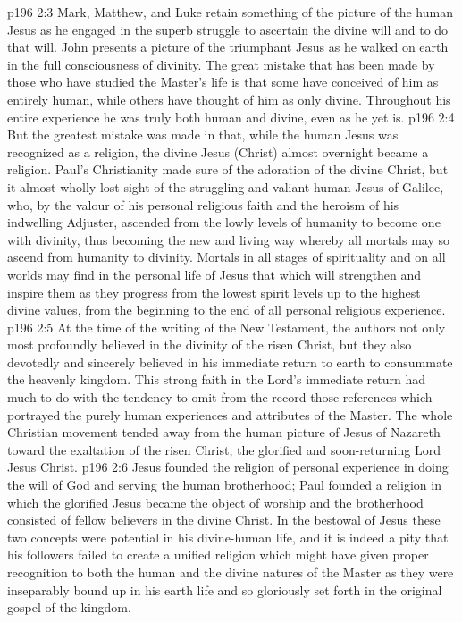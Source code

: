\vs p196 2:3 Mark, Matthew, and Luke retain something of the picture of the human Jesus as he engaged in the superb struggle to ascertain the divine will and to do that will. John presents a picture of the triumphant Jesus as he walked on earth in the full consciousness of divinity. The great mistake that has been made by those who have studied the Master’s life is that some have conceived of him as entirely human, while others have thought of him as only divine. Throughout his entire experience he was truly both human and divine, even as he yet is.
\vs p196 2:4 But the greatest mistake was made in that, while the human Jesus was recognized as  a religion, the divine Jesus (Christ) almost overnight became a religion. Paul’s Christianity made sure of the adoration of the divine Christ, but it almost wholly lost sight of the struggling and valiant human Jesus of Galilee, who, by the valour of his personal religious faith and the heroism of his indwelling Adjuster, ascended from the lowly levels of humanity to become one with divinity, thus becoming the new and living way whereby all mortals may so ascend from humanity to divinity. Mortals in all stages of spirituality and on all worlds may find in the personal life of Jesus that which will strengthen and inspire them as they progress from the lowest spirit levels up to the highest divine values, from the beginning to the end of all personal religious experience.
\vs p196 2:5 At the time of the writing of the New Testament, the authors not only most profoundly believed in the divinity of the risen Christ, but they also devotedly and sincerely believed in his immediate return to earth to consummate the heavenly kingdom. This strong faith in the Lord’s immediate return had much to do with the tendency to omit from the record those references which portrayed the purely human experiences and attributes of the Master. The whole Christian movement tended away from the human picture of Jesus of Nazareth toward the exaltation of the risen Christ, the glorified and soon\hyp{}returning Lord Jesus Christ.
\vs p196 2:6 \pc Jesus founded the religion of personal experience in doing the will of God and serving the human brotherhood; Paul founded a religion in which the glorified Jesus became the object of worship and the brotherhood consisted of fellow believers in the divine Christ. In the bestowal of Jesus these two concepts were potential in his divine\hyp{}human life, and it is indeed a pity that his followers failed to create a unified religion which might have given proper recognition to both the human and the divine natures of the Master as they were inseparably bound up in his earth life and so gloriously set forth in the original gospel of the kingdom.
